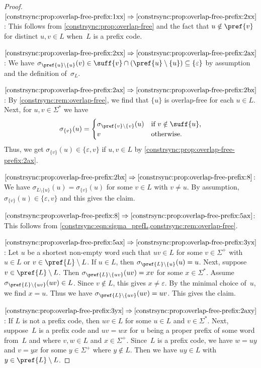\begin{proof}	
$\ref{constrsync:prop:overlap-free-prefix:1xx} \Rightarrow \ref{constrsync:prop:overlap-free-prefix:2xx}$: 
This follows from \cref{constrsync:prop:overlap-free} and the fact that 
$u \notin \pref{v}$ for distinct $u,v \in L$ when~$L$ is a prefix code.
	
$\ref{constrsync:prop:overlap-free-prefix:2xx} \Rightarrow \ref{constrsync:prop:overlap-free-prefix:2ax}$: 
We have $\sigma_{\pref{u}\setminus\{u\}}(v) \in \suff{v} \cap ( \pref{u} \setminus\{u\} ) \subseteq \{\varepsilon\}$ by assumption and the definition of~$\sigma_L$.
	
$\ref{constrsync:prop:overlap-free-prefix:2ax} \Rightarrow \ref{constrsync:prop:overlap-free-prefix:2bx}$:
By \cref{constrsync:rem:overlap-free}, we find that $\{u\}$ is overlap-free for each $u \in L$.
Next, for $u,v \in \Sigma^*$ we have
\[
\sigma_{\{v\}}(u) = \begin{cases}
	\sigma_{\pref{v}\setminus\{v\}}(u) & \text{if } v \notin \suff{u}, \\
	v & \text{otherwise.}	
\end{cases}
\]
Thus, we get $\sigma_{\{v\}}(u) \in \{\varepsilon,v\}$
if $u,v \in L$ by \cref{constrsync:prop:overlap-free-prefix:2ax}.

$\ref{constrsync:prop:overlap-free-prefix:2bx}\Rightarrow\ref{constrsync:prop:overlap-free-prefix:8}$: We have $\sigma_{L \setminus \{u\}}(u) = \sigma_{\{v\}}(u)$
for some $v \in L$ with $v \ne u$. By assumption, $\sigma_{\{v\}}(u) \in \{\varepsilon,v\}$
and this gives the claim.

$\ref{constrsync:prop:overlap-free-prefix:8}\Rightarrow\ref{constrsync:prop:overlap-free-prefix:5ax}$: This follows from \cref{constrsync:eqn:sigma_prefL,constrsync:rem:overlap-free}.

$\ref{constrsync:prop:overlap-free-prefix:5ax} \Rightarrow \ref{constrsync:prop:overlap-free-prefix:3yx}$:
Let $u$ be a shortest non-empty word such that $uv \in L$
for some $v \in \Sigma^+$
with $u \in L$ or $v \in \pref{L}\setminus L$.
If $u \in L$,
then $\sigma_{\pref{L}\setminus\{u\}}(u) = u$.
Next, suppose $v \in \pref{L}\setminus L$.
Then $\sigma_{\pref{L}\setminus\{uv\}}(uv) = xv$
for some $x \in \Sigma^*$.
Assume $\sigma_{\pref{L}\setminus\{uv\}}(uv) \in L$.
Since $v \notin L$, this gives $x \ne \varepsilon$.
By the minimal choice of~$u$, we find $x = u$.
Thus we have $\sigma_{\pref{L}\setminus\{uv\}}(uv) = uv$.
This gives the claim.

$\ref{constrsync:prop:overlap-free-prefix:3yx} \Rightarrow \ref{constrsync:prop:overlap-free-prefix:2axy}$:
If $L$ is not a prefix code, then $uv \in L$
for some $u \in L$ and $v \in \Sigma^*$.
Next, suppose~$L$ is a prefix code
and $uv = wx$ for $u$ being a proper prefix of some word from~$L$
and where $v,w \in L$ and $x \in \Sigma^+$.
Since~$L$ is a prefix code,
we have $w = uy$ and $v = yx$ for some $y \in \Sigma^+$
where $y \notin L$. Then we have $uy \in L$ with $y \in \pref{L}\setminus L$.


\end{proof}
